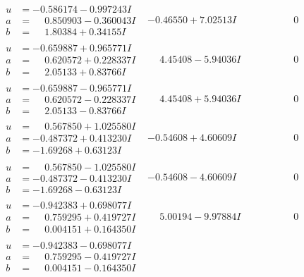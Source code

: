 \documentclass[1p]{elsarticle_modified}
\theoremstyle{definition}
\begin{document}
$$\begin{array}{c|c|c}
\begin{aligned}
u &= -0.586174 - 0.997243 I \\
a &= \phantom{-}0.850903 - 0.360043 I \\
b &= \phantom{-}1.80384 + 0.34155 I\end{aligned}
 & -0.46550 + 7.02513 I & \phantom{-0.000000 } 0 \\ \hline\begin{aligned}
u &= -0.659887 + 0.965771 I \\
a &= \phantom{-}0.620572 + 0.228337 I \\
b &= \phantom{-}2.05133 + 0.83766 I\end{aligned}
 & \phantom{-}4.45408 - 5.94036 I & \phantom{-0.000000 } 0 \\ \hline\begin{aligned}
u &= -0.659887 - 0.965771 I \\
a &= \phantom{-}0.620572 - 0.228337 I \\
b &= \phantom{-}2.05133 - 0.83766 I\end{aligned}
 & \phantom{-}4.45408 + 5.94036 I & \phantom{-0.000000 } 0 \\ \hline\begin{aligned}
u &= \phantom{-}0.567850 + 1.025580 I \\
a &= -0.487372 + 0.413230 I \\
b &= -1.69268 + 0.63123 I\end{aligned}
 & -0.54608 + 4.60609 I & \phantom{-0.000000 } 0 \\ \hline\begin{aligned}
u &= \phantom{-}0.567850 - 1.025580 I \\
a &= -0.487372 - 0.413230 I \\
b &= -1.69268 - 0.63123 I\end{aligned}
 & -0.54608 - 4.60609 I & \phantom{-0.000000 } 0 \\ \hline\begin{aligned}
u &= -0.942383 + 0.698077 I \\
a &= \phantom{-}0.759295 + 0.419727 I \\
b &= \phantom{-}0.004151 + 0.164350 I\end{aligned}
 & \phantom{-}5.00194 - 9.97884 I & \phantom{-0.000000 } 0 \\ \hline\begin{aligned}
u &= -0.942383 - 0.698077 I \\
a &= \phantom{-}0.759295 - 0.419727 I \\
b &= \phantom{-}0.004151 - 0.164350 I\end{aligned}

\end{array}$$
\end{document}

